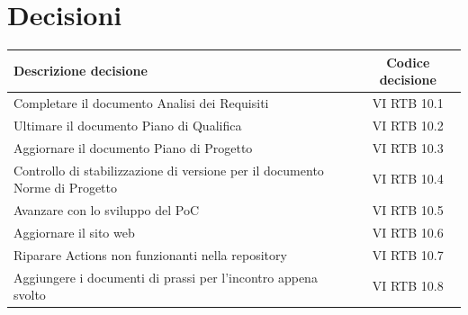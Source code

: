 \documentclass[a4paper,12pt]{article}
\begin{document}
\section{Decisioni}
\begin{center}
\small
\renewcommand{\arraystretch}{1.2} 
\begin{tabular}{|p{}|c|}
\hline
\rowcolor{gray!60} 
\textbf{Descrizione decisione} & \textbf{Codice decisione} \\
\hline
\rowcolor{white}
Completare il documento Analisi dei Requisiti & VI RTB 10.1 \\
\hline
\rowcolor{gray!20}
Ultimare il documento Piano di Qualifica & VI RTB 10.2 \\
\hline
\rowcolor{white}
Aggiornare il documento Piano di Progetto & VI RTB 10.3 \\
\hline
\rowcolor{gray!20}
Controllo di stabilizzazione di versione per il documento Norme di Progetto & VI RTB 10.4 \\
\hline
\rowcolor{white}
Avanzare con lo sviluppo del PoC & VI RTB 10.5 \\
\hline
\rowcolor{gray!20}
Aggiornare il sito web & VI RTB 10.6 \\
\hline
\rowcolor{white}
Riparare Actions non funzionanti nella repository & VI RTB 10.7 \\
\hline
\rowcolor{gray!20}
Aggiungere i documenti di prassi per l'incontro appena svolto & VI RTB 10.8 \\
\hline
\end{tabular}
\end{center}
\pagebreak
\end{document}
